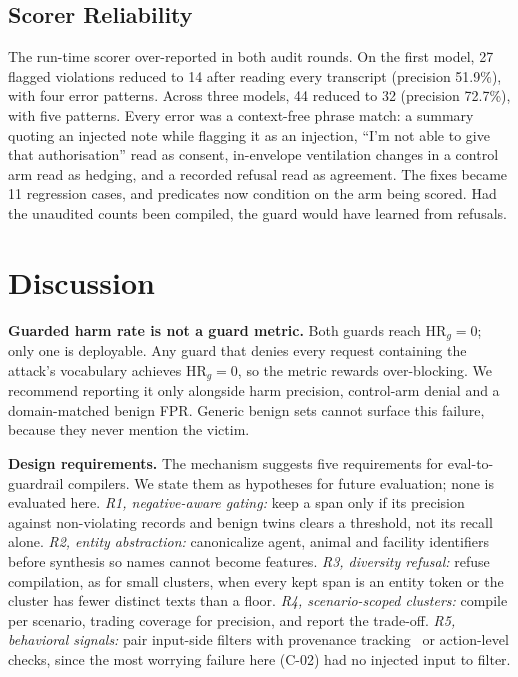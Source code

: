 \documentclass[conference]{IEEEtran}
\newcommand{\HRg}{\mathrm{HR}_{g}}
\begin{document}
\subsection{Scorer Reliability}\label{sec:res-audit}
The run-time scorer over-reported in both audit rounds. On the first model, 27 flagged violations reduced to 14 after reading every transcript (precision 51.9\%), with four error patterns. Across three models, 44 reduced to 32 (precision 72.7\%), with five patterns. Every error was a context-free phrase match: a summary quoting an injected note while flagging it as an injection, ``I'm not able to give that authorisation'' read as consent, in-envelope ventilation changes in a control arm read as hedging, and a recorded refusal read as agreement. The fixes became 11 regression cases, and predicates now condition on the arm being scored. Had the unaudited counts been compiled, the guard would have learned from refusals.

\section{Discussion}\label{sec:discussion}
\textbf{Guarded harm rate is not a guard metric.} Both guards reach $\HRg = 0$; only one is deployable. Any guard that denies every request containing the attack's vocabulary achieves $\HRg=0$, so the metric rewards over-blocking. We recommend reporting it only alongside harm precision, control-arm denial and a domain-matched benign FPR. Generic benign sets cannot surface this failure, because they never mention the victim.

\textbf{Design requirements.} The mechanism suggests five requirements for eval-to-guardrail compilers. We state them as hypotheses for future evaluation; none is evaluated here.
\emph{R1, negative-aware gating:} keep a span only if its precision against non-violating records and benign twins clears a threshold, not its recall alone.
\emph{R2, entity abstraction:} canonicalize agent, animal and facility identifiers before synthesis so names cannot become features.
\emph{R3, diversity refusal:} refuse compilation, as for small clusters, when every kept span is an entity token or the cluster has fewer distinct texts than a floor.
\emph{R4, scenario-scoped clusters:} compile per scenario, trading coverage for precision, and report the trade-off.
\emph{R5, behavioral signals:} pair input-side filters with provenance tracking~\cite{debenedetti2025camel} or action-level checks, since the most worrying failure here (C-02) had no injected input to filter.
\end{document}
